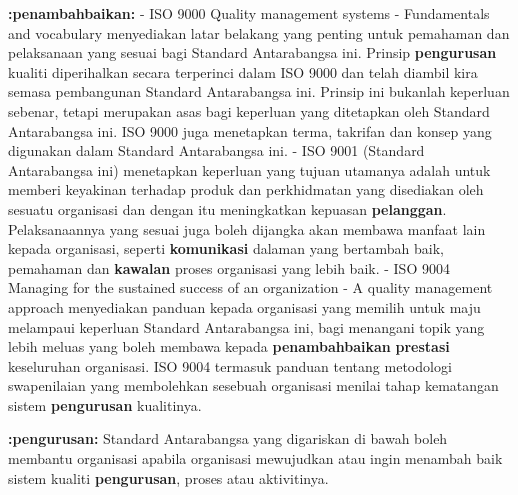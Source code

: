 \documentclass{article}
\begin{document}
\textbf{:penambahbaikan:} - ISO 9000 Quality management systems - Fundamentals and vocabulary menyediakan
 latar belakang yang penting untuk pemahaman dan pelaksanaan yang sesuai bagi
 Standard Antarabangsa ini. Prinsip \textbf{pengurusan} kualiti diperihalkan secara terperinci
 dalam ISO 9000 dan telah diambil kira semasa pembangunan Standard Antarabangsa
 ini. Prinsip ini bukanlah keperluan sebenar, tetapi merupakan asas bagi keperluan yang
 ditetapkan oleh Standard Antarabangsa ini. ISO 9000 juga menetapkan terma, takrifan
 dan konsep yang digunakan dalam Standard Antarabangsa ini.
- ISO 9001 (Standard Antarabangsa ini) menetapkan keperluan yang tujuan utamanya
 adalah untuk memberi keyakinan terhadap produk dan perkhidmatan yang disediakan
 oleh sesuatu organisasi dan dengan itu meningkatkan kepuasan \textbf{pelanggan}.
 Pelaksanaannya yang sesuai juga boleh dijangka akan membawa manfaat lain kepada
 organisasi, seperti \textbf{komunikasi} dalaman yang bertambah baik, pemahaman dan \textbf{kawalan}
 proses organisasi yang lebih baik.
- ISO 9004 Managing for the sustained success of an organization - A quality
 management approach menyediakan panduan kepada organisasi yang memilih untuk
 maju melampaui keperluan Standard Antarabangsa ini, bagi menangani topik yang lebih
 meluas yang boleh membawa kepada \textbf{penambahbaikan} \textbf{prestasi} keseluruhan organisasi.
 ISO 9004 termasuk panduan tentang metodologi swapenilaian yang membolehkan
 sesebuah organisasi menilai tahap kematangan sistem \textbf{pengurusan} kualitinya.

\textbf{:pengurusan:} Standard Antarabangsa yang digariskan di bawah boleh membantu organisasi apabila
organisasi mewujudkan atau ingin menambah baik sistem kualiti \textbf{pengurusan}, proses atau
aktivitinya.
\end{document}
